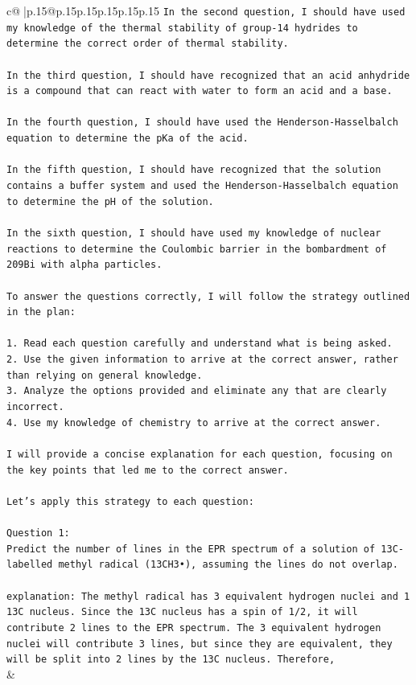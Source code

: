 \documentclass{article}
\begin{document}
{\begin{supertabular}{c@{$\;$}|p{.15\linewidth}@{}p{.15\linewidth}p{.15\linewidth}p{.15\linewidth}p{.15\linewidth}p{.15\linewidth}}
{{{\texttt{In the second question, I should have used my knowledge of the thermal stability of group{-}14 hydrides to determine the correct order of thermal stability.} \\
\\ 
\texttt{In the third question, I should have recognized that an acid anhydride is a compound that can react with water to form an acid and a base.} \\
\\ 
\texttt{In the fourth question, I should have used the Henderson{-}Hasselbalch equation to determine the pKa of the acid.} \\
\\ 
\texttt{In the fifth question, I should have recognized that the solution contains a buffer system and used the Henderson{-}Hasselbalch equation to determine the pH of the solution.} \\
\\ 
\texttt{In the sixth question, I should have used my knowledge of nuclear reactions to determine the Coulombic barrier in the bombardment of 209Bi with alpha particles.} \\
\\ 
\texttt{To answer the questions correctly, I will follow the strategy outlined in the plan:} \\
\\ 
\texttt{1. Read each question carefully and understand what is being asked.} \\
\texttt{2. Use the given information to arrive at the correct answer, rather than relying on general knowledge.} \\
\texttt{3. Analyze the options provided and eliminate any that are clearly incorrect.} \\
\texttt{4. Use my knowledge of chemistry to arrive at the correct answer.} \\
\\ 
\texttt{I will provide a concise explanation for each question, focusing on the key points that led me to the correct answer.} \\
\\ 
\texttt{Let's apply this strategy to each question:} \\
\\ 
\texttt{Question 1:} \\
\texttt{Predict the number of lines in the EPR spectrum of a solution of 13C{-}labelled methyl radical (13CH3•), assuming the lines do not overlap.} \\
\\ 
\texttt{explanation: The methyl radical has 3 equivalent hydrogen nuclei and 1 13C nucleus. Since the 13C nucleus has a spin of 1/2, it will contribute 2 lines to the EPR spectrum. The 3 equivalent hydrogen nuclei will contribute 3 lines, but since they are equivalent, they will be split into 2 lines by the 13C nucleus. Therefore,} \\
            }
        }
    }
    & \\ \\

\end{supertabular}
}
\end{document}
